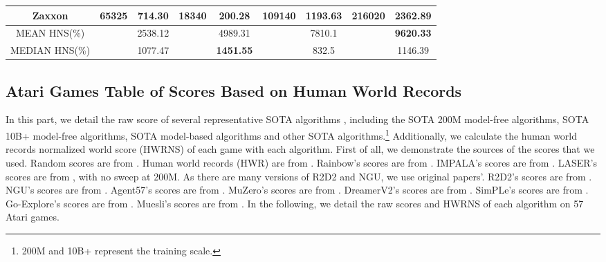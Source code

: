 \documentclass[nohyperref]{article}
\def\GDIHmeanhns{9620.33}
\def\GDIHmedianhns{1146.39}
\def\GDIImeanhns{7810.1}
\def\GDIImedianhns{832.5}
\def\mueslimeanhns{2538.12}
\def\mueslimedianhns{1077.47}
\def\goexploremeanhns{4989.31}
\def\goexploremedianhns{1451.55}
\theoremstyle{plain}
\begin{document}
\begin{table}[!hb]
\begin{center}
\begin{tabular}{|c |c c| c c| c c |c c|}
 Zaxxon         &65325         &714.30                 &18340                 &200.28                         & 109140     &1193.63       &\textbf{216020	}          &\textbf{2362.89}    \\
\hline    
MEAN HNS(\%)        & & \mueslimeanhns           &                       & \goexploremeanhns                       &            &  \GDIImeanhns &      & \textbf{\GDIHmeanhns} \\
\hline
MEDIAN HNS(\%)      & & \mueslimedianhns           &                       & \textbf{\goexploremedianhns}              &            & \GDIImedianhns   &      & \GDIHmedianhns \\
\hline
\end{tabular}
\end{center}
\end{table}



\clearpage

\subsection{Atari Games Table of Scores Based on Human World Records}
\label{app: Atari Games Table of Scores Based on Human World Records}
In this part, we detail the raw score of several representative SOTA algorithms , including the SOTA 200M model-free algorithms, SOTA 10B+ model-free algorithms, SOTA model-based algorithms and other SOTA algorithms.\footnote{200M and 10B+ represent the training scale.} Additionally, we calculate the human world records normalized world score (HWRNS) of each game with each algorithm. First of all, we demonstrate the sources of the scores that we used.
Random scores  are from \citep{agent57}.
Human world records (HWR) are from \citep{dreamerv2,atarihuman}.
Rainbow's scores are from \citep{rainbow}.
IMPALA's scores are from \citep{impala}.
LASER's scores are from \citep{laser}, with no sweep at 200M.
As there are many versions of R2D2 and NGU, we use original papers'.
R2D2's scores are from \citep{r2d2}.
NGU's scores are from \citep{ngu}.
Agent57's scores are from \citep{agent57}.
MuZero's scores are from \citep{muzero}.
DreamerV2's scores are from \citep{dreamerv2}.
SimPLe's scores are from \citep{modelbasedatari}.
Go-Explore's scores are from \citep{goexplore}.
Muesli's scores are from \citep{muesli}.
In the following,  we detail the raw scores and HWRNS of each algorithm on 57 Atari games.
\end{document}
